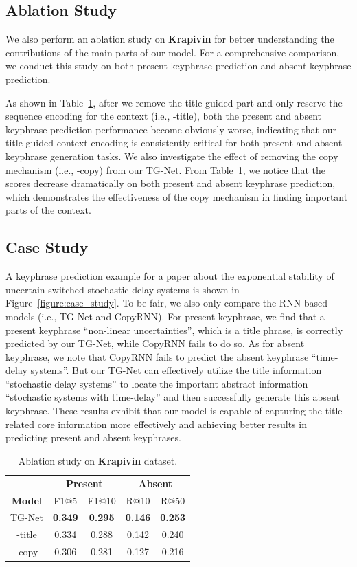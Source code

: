 \documentclass[letterpaper]{article} %
\begin{document}
\subsection{Ablation Study}
We also perform an ablation study on \textbf{Krapivin} for better understanding the contributions of the main parts of our model. For a comprehensive comparison, we conduct this study on both present keyphrase prediction and absent keyphrase prediction.

As shown in Table~\ref{table:ablation study}, after we remove the title-guided part and only reserve the sequence encoding for the context (i.e., -title), both the present and absent keyphrase prediction performance become obviously worse, indicating that our title-guided context encoding is consistently critical for both present and absent keyphrase generation tasks. We also investigate the effect of removing the copy mechanism (i.e., -copy) from our TG-Net. From Table~\ref{table:ablation study}, we notice that the scores decrease dramatically on both present and absent keyphrase prediction, which demonstrates the effectiveness of the copy mechanism in finding important parts of the context.


\subsection{Case Study}
A keyphrase prediction example for a paper about the exponential stability of uncertain switched stochastic delay systems is shown in Figure~\ref{figure:case_study}. To be fair, we also only compare the RNN-based models (i.e., TG-Net and CopyRNN). For present keyphrase, we find that a present keyphrase ``non-linear uncertainties'', which is a title phrase, is correctly predicted by our TG-Net, while CopyRNN fails to do so. As for absent keyphrase, we note that CopyRNN fails to predict the absent keyphrase ``time-delay systems''. But our TG-Net can effectively utilize the title information ``stochastic delay systems'' to locate the important abstract information ``stochastic systems with time-delay'' and then successfully generate this absent keyphrase. These results exhibit that our model is capable of capturing the title-related core information more effectively and achieving better results in predicting present and absent keyphrases.


\begin{table}[t]
\centering
\begin{tabular}{c| c c| c c}
  \hline
  \hline
  & \multicolumn{2}{c|}{\textbf{Present}} & \multicolumn{2}{c}{\textbf{Absent}}
  \\
  \textbf{Model} & F1@5 & F1@10 & R@10 & R@50
  \\
  \hline
  \hline
  TG-Net & \textbf{0.349} & \textbf{0.295} & \textbf{0.146} & \textbf{0.253}\\
  \hline
 -title & 0.334 & 0.288 & 0.142 & 0.240\\
  \hline
 -copy & 0.306 & 0.281 & 0.127 & 0.216\\
  \hline
\end{tabular}
\caption{Ablation study on \textbf{Krapivin} dataset.}
\label{table:ablation study}
\end{table}
\end{document}
